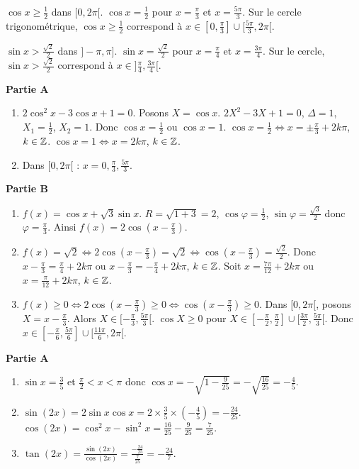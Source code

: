 $\cos x \ge \frac12$ dans $[0,2\pi[$.
$\cos x = \frac12$ pour $x = \frac{\pi}{3}$ et $x = \frac{5\pi}{3}$.
Sur le cercle trigonométrique, $\cos x \ge \frac12$ correspond à $x \in [0,\frac{\pi}{3}] \cup [\frac{5\pi}{3},2\pi[$.

$\sin x > \frac{\sqrt2}{2}$ dans $]-\pi,\pi]$.
$\sin x = \frac{\sqrt2}{2}$ pour $x = \frac{\pi}{4}$ et $x = \frac{3\pi}{4}$.
Sur le cercle, $\sin x > \frac{\sqrt2}{2}$ correspond à $x \in ]\frac{\pi}{4}, \frac{3\pi}{4}[$.

\textbf{Partie A}
\begin{enumerate}[label=\arabic*)]
    \item $2\cos^2 x - 3\cos x + 1 = 0$. Posons $X = \cos x$. $2X^2 - 3X + 1 = 0$, $\Delta = 1$, $X_1 = \frac12$, $X_2 = 1$.
    Donc $\cos x = \frac12$ ou $\cos x = 1$.
    $\cos x = \frac12 \iff x = \pm\frac{\pi}{3} + 2k\pi$, $k\in\mathbb{Z}$.
    $\cos x = 1 \iff x = 2k\pi$, $k\in\mathbb{Z}$.
    \item Dans $[0,2\pi[$ : $x = 0, \frac{\pi}{3}, \frac{5\pi}{3}$.
\end{enumerate}

\textbf{Partie B}
\begin{enumerate}[label=\arabic*)]
    \item $f(x) = \cos x + \sqrt3\sin x$. $R = \sqrt{1+3} = 2$, $\cos\varphi = \frac12$, $\sin\varphi = \frac{\sqrt3}{2}$ donc $\varphi = \frac{\pi}{3}$.
    Ainsi $f(x) = 2\cos\left(x-\frac{\pi}{3}\right)$.
    \item $f(x) = \sqrt2 \iff 2\cos\left(x-\frac{\pi}{3}\right) = \sqrt2 \iff \cos\left(x-\frac{\pi}{3}\right) = \frac{\sqrt2}{2}$.
    Donc $x-\frac{\pi}{3} = \frac{\pi}{4} + 2k\pi$ ou $x-\frac{\pi}{3} = -\frac{\pi}{4} + 2k\pi$, $k\in\mathbb{Z}$.
    Soit $x = \frac{7\pi}{12} + 2k\pi$ ou $x = \frac{\pi}{12} + 2k\pi$, $k\in\mathbb{Z}$.
    \item $f(x) \ge 0 \iff 2\cos\left(x-\frac{\pi}{3}\right) \ge 0 \iff \cos\left(x-\frac{\pi}{3}\right) \ge 0$.
    Dans $[0,2\pi[$, posons $X = x-\frac{\pi}{3}$. Alors $X \in [-\frac{\pi}{3}, \frac{5\pi}{3}[$.
    $\cos X \ge 0$ pour $X \in [-\frac{\pi}{2}, \frac{\pi}{2}] \cup [\frac{3\pi}{2}, \frac{5\pi}{3}[$.
    Donc $x \in [-\frac{\pi}{6}, \frac{5\pi}{6}] \cup [\frac{11\pi}{6}, 2\pi[$.
\end{enumerate}

\textbf{Partie A}
\begin{enumerate}[label=\arabic*)]
    \item $\sin x = \frac35$ et $\frac{\pi}{2}<x<\pi$ donc $\cos x = -\sqrt{1-\frac{9}{25}} = -\sqrt{\frac{16}{25}} = -\frac45$.
    \item $\sin(2x) = 2\sin x\cos x = 2\times\frac35\times\left(-\frac45\right) = -\frac{24}{25}$.
    $\cos(2x) = \cos^2 x - \sin^2 x = \frac{16}{25} - \frac{9}{25} = \frac{7}{25}$.
    \item $\tan(2x) = \frac{\sin(2x)}{\cos(2x)} = \frac{-\frac{24}{25}}{\frac{7}{25}} = -\frac{24}{7}$.
\end{enumerate}

